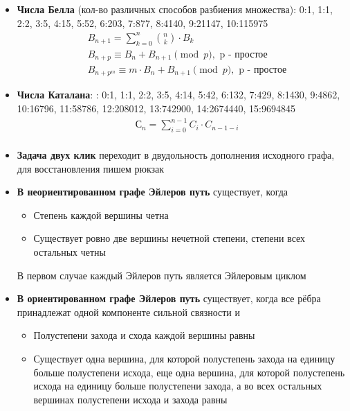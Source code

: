 \documentclass[10pt]{article}
\begin{document}
\begin{itemize}
\begin{longtable}[c]{llllllll}
\end{longtable}
\item \textbf{Числа Белла} (кол-во различных способов разбиения множества): 0:1, 1:1, 2:2, 3:5, 4:15, 5:52, 6:203, 7:877, 8:4140, 9:21147, 10:115975\\
\begin{equation}
  \begin{split}
    &B_{n + 1} = \sum\limits_{k = 0}^n\binom{n}{k} \cdot B_k\\
    &B_{n + p} \equiv B_n + B_{n + 1}\pmod{p}, \text{ p - простое}\\
    &B_{n + p^m} \equiv m \cdot B_n + B_{n + 1}\pmod{p}, \text{ p - простое}
  \end{split}
\end{equation}

\item \textbf{Числа Каталана}: : 0:1, 1:1, 2:2, 3:5, 4:14, 5:42, 6:132, 7:429, 8:1430, 9:4862, 10:16796, 11:58786, 12:208012, 13:742900,
14:2674440, 15:9694845
\begin{equation}
  \begin{split}
    &С_{n} = \sum\limits_{i = 0}^{n - 1}C_i \cdot C_{n - 1 - i}\\
  \end{split}
\end{equation}
\item \textbf{Задача двух клик} переходит в двудольность дополнения исходного графа, для восстановления пишем рюкзак
\item \textbf{В неориентированном графе Эйлеров путь} существует, когда 
\begin{itemize}
  \item Степень каждой вершины четна
  \item Существует ровно две вершины нечетной степени, степени всех остальных четны
\end{itemize}
В первом случае каждый Эйлеров путь является Эйлеровым циклом
\item \textbf{В ориентированном графе Эйлеров путь} существует, когда все рёбра принадлежат одной компоненте сильной связности и
\begin{itemize}
  \item Полустепени захода и схода каждой вершины равны
  \item Существует одна вершина, для которой полустепень захода на единицу
  больше полустепени исхода, еще одна вершина, для которой полустепень исхода на единицу больше полустепени захода,
  а во всех остальных вершинах полустепени исхода и захода равны

\end{itemize}
\end{itemize}
\end{document}
